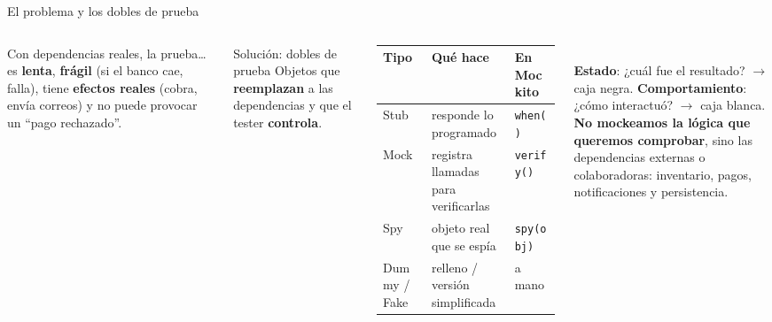 \documentclass[aspectratio=169,10pt]{beamer}
\newcommand{\code}[1]{\texttt{#1}}
\begin{document}
\begin{frame}{El problema y los dobles de prueba}
\begin{columns}[T]
\centering
{}

\vspace{0.2cm}
\begin{alertblock}{Con dependencias reales, la prueba\ldots}
\scriptsize es \textbf{lenta}, \textbf{frágil} (si el banco cae, falla), tiene \textbf{efectos reales} (cobra, envía correos) y no puede provocar un ``pago rechazado''.
\end{alertblock}
\begin{exampleblock}{Solución: dobles de prueba}
\scriptsize Objetos que \textbf{reemplazan} a las dependencias y que el tester \textbf{controla}.
\end{exampleblock}
\scriptsize
\setlength{\tabcolsep}{3pt}
\begin{tabularx}{\linewidth}{@{}lXl@{}}
\toprule
\textbf{Tipo} & \textbf{Qué hace} & \textbf{En Mockito}\\
\midrule
\alert{Stub} & responde lo programado & \code{when()}\\
\alert{Mock} & registra llamadas para verificarlas & \code{verify()}\\
\alert{Spy} & objeto real que se espía & \code{spy(obj)}\\
Dummy / Fake & relleno / versión simplificada & a mano\\
\bottomrule
\end{tabularx}\\[4pt]
\textbf{Estado}: ¿cuál fue el resultado? $\rightarrow$ caja negra. \textbf{Comportamiento}: ¿cómo interactuó? $\rightarrow$ caja blanca.\\[3pt]
\textcolor{primario}{\faInfoCircle} \textbf{No mockeamos la lógica que queremos comprobar}, sino las dependencias externas o colaboradoras: inventario, pagos, notificaciones y persistencia.
\end{columns}
\end{frame}
\end{document}

